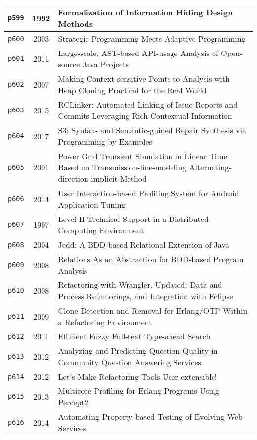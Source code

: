 \begin{longtable}{| c | c | p{16cm} |}
  \hline
  \texttt{p599} & 1992 & Formalization of Information Hiding Design Methods \\
  \hline
  \texttt{p600} & 2003 & Strategic Programming Meets Adaptive Programming \\
  \hline
  \texttt{p601} & 2011 & Large-scale, AST-based API-usage Analysis of Open-source Java Projects \\
  \hline
  \texttt{p602} & 2007 & Making Context-sensitive Points-to Analysis with Heap Cloning Practical for the Real World \\
  \hline
  \texttt{p603} & 2015 & RCLinker: Automated Linking of Issue Reports and Commits Leveraging Rich Contextual Information \\
  \hline
  \texttt{p604} & 2017 & S3: Syntax- and Semantic-guided Repair Synthesis via Programming by Examples \\
  \hline
  \texttt{p605} & 2001 & Power Grid Transient Simulation in Linear Time Based on Transmission-line-modeling Alternating-direction-implicit Method \\
  \hline
  \texttt{p606} & 2014 & User Interaction-based Profiling System for Android Application Tuning \\
  \hline
  \texttt{p607} & 1997 & Level II Technical Support in a Distributed Computing Environment \\
  \hline
  \texttt{p608} & 2004 & Jedd: A BDD-based Relational Extension of Java \\
  \hline
  \texttt{p609} & 2008 & Relations As an Abstraction for BDD-based Program Analysis \\
  \hline
  \texttt{p610} & 2008 & Refactoring with Wrangler, Updated: Data and Process Refactorings, and Integration with Eclipse \\
  \hline
  \texttt{p611} & 2009 & Clone Detection and Removal for Erlang/OTP Within a Refactoring Environment \\
  \hline
  \texttt{p612} & 2011 & Efficient Fuzzy Full-text Type-ahead Search \\
  \hline
  \texttt{p613} & 2012 & Analyzing and Predicting Question Quality in Community Question Answering Services \\
  \hline
  \texttt{p614} & 2012 & Let's Make Refactoring Tools User-extensible! \\
  \hline
  \texttt{p615} & 2013 & Multicore Profiling for Erlang Programs Using Percept2 \\
  \hline
  \texttt{p616} & 2014 & Automating Property-based Testing of Evolving Web Services \\

\end{longtable}

